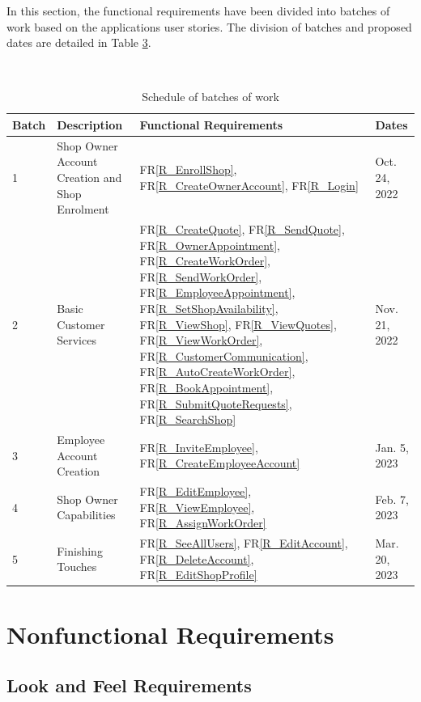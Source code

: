 \documentclass[12pt]{article}
\begin{document}
In this section, the functional requirements have been divided into batches of work based on the applications user stories. The division of batches and proposed dates are detailed in Table \hyperref[tab:phaseInPlan]{3}.

\begin{table}[ht!]
  \caption{Schedule of batches of work} \\
  \label{tab:phaseInPlan}
  \centering
  \begin{tabular}{l|p{}|p{}|p{}}
  \toprule
  \textbf{Batch} & \textbf{Description} & \textbf{Functional Requirements} & \textbf{Dates}\\
  \midrule
  1 & Shop Owner Account Creation and Shop Enrolment & FR\ref{R_EnrollShop}, FR\ref{R_CreateOwnerAccount}, FR\ref{R_Login} & Oct. 24, 2022\\
  \hline
  2 & Basic Customer Services & FR\ref{R_CreateQuote}, FR\ref{R_SendQuote}, FR\ref{R_OwnerAppointment}, FR\ref{R_CreateWorkOrder}, FR\ref{R_SendWorkOrder}, FR\ref{R_EmployeeAppointment}, FR\ref{R_SetShopAvailability}, FR\ref{R_ViewShop}, FR\ref{R_ViewQuotes}, FR\ref{R_ViewWorkOrder}, FR\ref{R_CustomerCommunication}, FR\ref{R_AutoCreateWorkOrder}, FR\ref{R_BookAppointment}, FR\ref{R_SubmitQuoteRequests}, FR\ref{R_SearchShop} & Nov. 21, 2022\\
  \hline
  3 & Employee Account Creation & FR\ref{R_InviteEmployee}, FR\ref{R_CreateEmployeeAccount} & Jan. 5, 2023 \\
  \hline
  4 & Shop Owner Capabilities & FR\ref{R_EditEmployee}, FR\ref{R_ViewEmployee}, FR\ref{R_AssignWorkOrder} & Feb. 7, 2023\\
  \hline
  5 & Finishing Touches & FR\ref{R_SeeAllUsers}, FR\ref{R_EditAccount}, FR\ref{R_DeleteAccount}, FR\ref{R_EditShopProfile} & Mar. 20, 2023\\
  \bottomrule
  \end{tabular}
  
\end{table}

\section{Nonfunctional Requirements} 
\label{sec:NFuncReq}

\subsection{Look and Feel Requirements}
\end{document}
